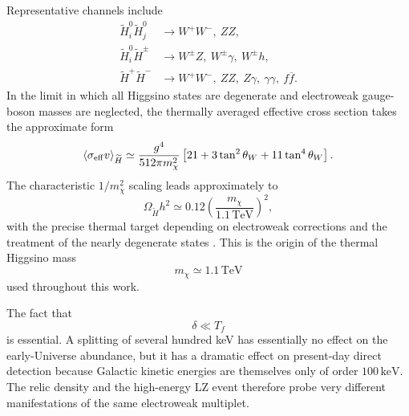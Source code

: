 \documentclass[aps,prd,reprint,superscriptaddress,nofootinbib,longbibliography,floatfix]{revtex4-2}
\newcommand{\TeV}{\mathrm{TeV}}
\newcommand{\keV}{\mathrm{keV}}
\begin{document}
Representative channels include
\begin{align}
\widetilde H_i^0\widetilde H_j^0
&\rightarrow
W^+W^-,
\ ZZ,
\\
\widetilde H_i^0\widetilde H^\pm
&\rightarrow
W^\pm Z,
\ W^\pm\gamma,
\ W^\pm h,
\\
\widetilde H^+\widetilde H^-
&\rightarrow
W^+W^-,
\ ZZ,
\ Z\gamma,
\ \gamma\gamma,
\ f\overline f.
\end{align}
In the limit in which all Higgsino states are degenerate and electroweak gauge-boson masses are neglected, the thermally averaged effective cross section takes the approximate form
\begin{equation}
\left\langle
\sigma_{\rm eff}v
\right\rangle_{\widetilde H}
\simeq
\frac{g^4}
{512\pi m_\chi^2}
\left[
21
+
3\tan^2\theta_W
+
11\tan^4\theta_W
\right].
\label{eq:higgsino_sigma_eff}
\end{equation}
The characteristic $1/m_\chi^2$ scaling leads approximately to
\begin{equation}
\Omega_{\widetilde H}h^2
\simeq
0.12
\left(
\frac{m_\chi}{1.1\,\TeV}
\right)^2,
\label{eq:higgsino_relic_scaling}
\end{equation}
with the precise thermal target depending on electroweak corrections and the treatment of the nearly degenerate states \cite{KrallReece2018,Rodd2024,Graham2025}. This is the origin of the thermal Higgsino mass
\begin{equation}
m_\chi\simeq1.1\,\TeV
\end{equation}
used throughout this work.

The fact that
\begin{equation}
\delta\ll T_f
\end{equation}
is essential. A splitting of several hundred keV has essentially no effect on the early-Universe abundance, but it has a dramatic effect on present-day direct detection because Galactic kinetic energies are themselves only of order $100\,\keV$. The relic density and the high-energy LZ event therefore probe very different manifestations of the same electroweak multiplet.
\end{document}
